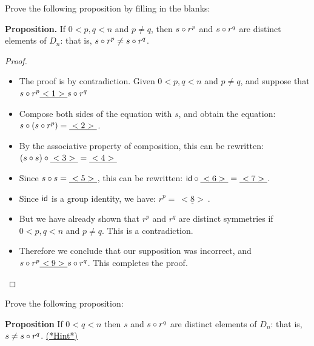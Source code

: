 \begin{exercise}{32}
Prove the following proposition by filling in the blanks:
\medskip

\noindent \textbf{Proposition.} 
If $0< p,q < n$ and $p \neq q$, then $s \circ r^p$ and $s \circ r^q$ are distinct elements of $D_n$: that is, $s\circ r^p \neq s \circ r^q$.
\medskip

\begin{proof}
\begin{itemize}
\item
 The proof is by contradiction. Given  $0< p,q < n$ and  $p \neq q$, and suppose that $s \circ r^p  \underline{~<1>~} s \circ r^q$
\item
Compose both sides of the equation with $s$, and obtain the equation:  $s \circ (s \circ r^p) =  \underline{~<2>~} $.
\item
By the associative property of composition, this can be rewritten: $(s \circ s) \circ \underline{~<3>~}  =  \underline{~<4>~}$
\item
Since $s \circ s = \underline{~<5>~}$, this can be rewritten: ${\sf{i}d} \circ \underline{~<6>~}  =  \underline{~<7>~}$.
\item
Since ${\sf{i}d}$ is a group identity, we have: $r^p = \underline{~<8>~}$.
\item
But we have already shown that $r^p$ and $r^q$ are distinct symmetries if $0< p,q < n$ and  $p \neq q$. This is a contradiction.
\item
Therefore we conclude that our supposition was incorrect, and $s \circ r^p  \underline{~<9>~} s \circ r^q$. This completes the proof.
\end{itemize}
\end{proof}
\end{exercise}

\begin{exercise}{33}
Prove the following proposition: 
\medskip

\noindent
\textbf{Proposition}
If $0< q < n$  then $s$ and $s \circ r^q$ are distinct elements of $D_n$: that is, $s \neq s \circ r^q$.
\medskip
\hyperref[sec:symmetries:hints]{(*Hint*)}
\end{exercise}

